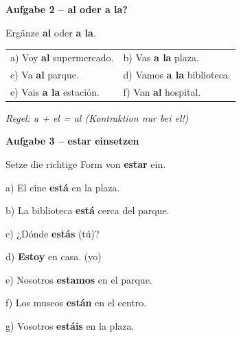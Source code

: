 \documentclass[11pt, a4paper]{article}
\newcommand{\fachfarbe}{spanisch}
\newcommand{\punktebox}[1]{\hfill\fbox{\small \_\_\_/#1}}
\newcommand{\lsg}[1]{\textcolor{loesung}{\textbf{#1}}}
\newenvironment{aufgabe}[1]{%
    \needspace{5\baselineskip}%
    \nopagebreak[4]%
    \vspace{10pt}
    \noindent\textbf{\textcolor{\fachfarbe}{Aufgabe #1}}
    \nopagebreak[4]%
    \vspace{5pt}
    \nopagebreak[4]%
    \begin{list}{}{\leftmargin=0pt}
    \item[]
}{%
    \end{list}
}
\newcommand{\es}[1]{\textcolor{\fachfarbe}{\textbf{#1}}}
\begin{document}
\begin{aufgabe}{2 -- al oder a la?}
Ergänze \es{al} oder \es{a la}. \punktebox{6}
\end{aufgabe}

\noindent
\begin{tabular}{p{}p{}}
a) Voy \lsg{al} supermercado. & b) Vas \lsg{a la} plaza. \\[0.8em]
c) Va \lsg{al} parque. & d) Vamos \lsg{a la} biblioteca. \\[0.8em]
e) Vais \lsg{a la} estación. & f) Van \lsg{al} hospital. \\
\end{tabular}

\vspace{0.5em}
\textcolor{loesung}{\textit{Regel: a + el = al (Kontraktion nur bei el!)}}

\vspace{15pt}


\begin{aufgabe}{3 -- estar einsetzen}
Setze die richtige Form von \es{estar} ein. \punktebox{8}
\end{aufgabe}

\noindent
a) El cine \lsg{está} en la plaza.

\vspace{0.8em}

\noindent
b) La biblioteca \lsg{está} cerca del parque.

\vspace{0.8em}

\noindent
c) ¿Dónde \lsg{estás} (tú)?

\vspace{0.8em}

\noindent
d) \lsg{Estoy} en casa. (yo)

\vspace{0.8em}

\noindent
e) Nosotros \lsg{estamos} en el parque.

\vspace{0.8em}

\noindent
f) Los museos \lsg{están} en el centro.

\vspace{0.8em}

\noindent
g) Vosotros \lsg{estáis} en la plaza.
\end{document}
